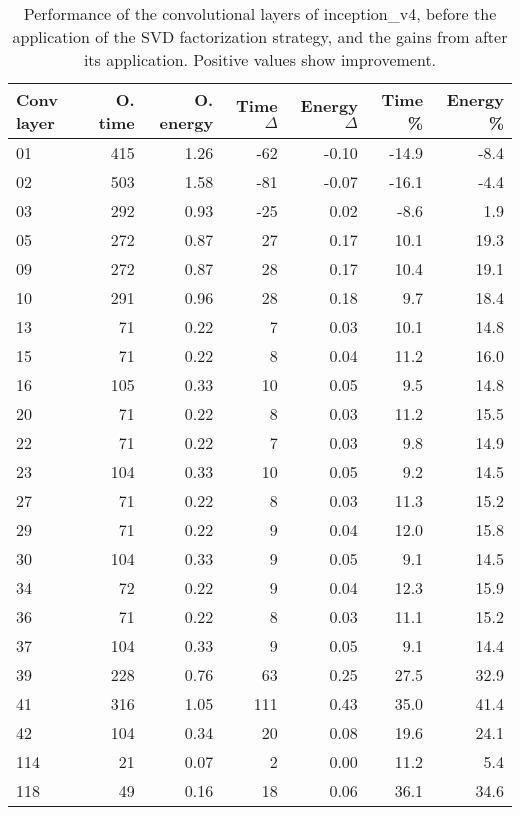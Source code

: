 \begin{table}
\centering
\begin{tabular}{|l|r|r|r|r|r|r|}
\hline
Conv layer & O. time & O. energy & Time $\Delta$ & Energy $\Delta$ & Time \% & Energy \% \\\hline
01 & 415 & 1.26 & -62 & -0.10 & -14.9 & -8.4 \\\hline
02 & 503 & 1.58 & -81 & -0.07 & -16.1 & -4.4 \\\hline
03 & 292 & 0.93 & -25 & 0.02 & -8.6 & 1.9 \\\hline
05 & 272 & 0.87 & 27 & 0.17 & 10.1 & 19.3 \\\hline
09 & 272 & 0.87 & 28 & 0.17 & 10.4 & 19.1 \\\hline
10 & 291 & 0.96 & 28 & 0.18 & 9.7 & 18.4 \\\hline
13 & 71 & 0.22 & 7 & 0.03 & 10.1 & 14.8 \\\hline
15 & 71 & 0.22 & 8 & 0.04 & 11.2 & 16.0 \\\hline
16 & 105 & 0.33 & 10 & 0.05 & 9.5 & 14.8 \\\hline
20 & 71 & 0.22 & 8 & 0.03 & 11.2 & 15.5 \\\hline
22 & 71 & 0.22 & 7 & 0.03 & 9.8 & 14.9 \\\hline
23 & 104 & 0.33 & 10 & 0.05 & 9.2 & 14.5 \\\hline
27 & 71 & 0.22 & 8 & 0.03 & 11.3 & 15.2 \\\hline
29 & 71 & 0.22 & 9 & 0.04 & 12.0 & 15.8 \\\hline
30 & 104 & 0.33 & 9 & 0.05 & 9.1 & 14.5 \\\hline
34 & 72 & 0.22 & 9 & 0.04 & 12.3 & 15.9 \\\hline
36 & 71 & 0.22 & 8 & 0.03 & 11.1 & 15.2 \\\hline
37 & 104 & 0.33 & 9 & 0.05 & 9.1 & 14.4 \\\hline
39 & 228 & 0.76 & 63 & 0.25 & 27.5 & 32.9 \\\hline
41 & 316 & 1.05 & 111 & 0.43 & 35.0 & 41.4 \\\hline
42 & 104 & 0.34 & 20 & 0.08 & 19.6 & 24.1 \\\hline
114 & 21 & 0.07 & 2 & 0.00 & 11.2 & 5.4 \\\hline
118 & 49 & 0.16 & 18 & 0.06 & 36.1 & 34.6 \\\hline
\end{tabular}
\caption{Performance of the convolutional layers of inception\_v4, before the application of the SVD factorization strategy, and the gains from after its application. Positive values show improvement.}
\label{inception_v4-performance}
\end{table}
